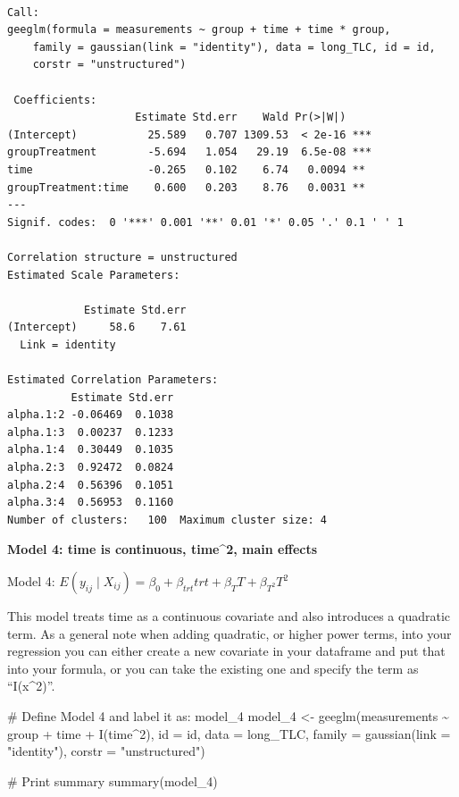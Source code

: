 \documentclass[
  letterpaper,
  DIV=11,
  numbers=noendperiod]{scrreprt}
\newenvironment{Shaded}{\begin{snugshade}}{\end{snugshade}}
\newcommand{\AttributeTok}[1]{\textcolor[rgb]{0.40,0.45,0.13}{#1}}
\newcommand{\CommentTok}[1]{\textcolor[rgb]{0.37,0.37,0.37}{#1}}
\newcommand{\DecValTok}[1]{\textcolor[rgb]{0.68,0.00,0.00}{#1}}
\newcommand{\FunctionTok}[1]{\textcolor[rgb]{0.28,0.35,0.67}{#1}}
\newcommand{\NormalTok}[1]{\textcolor[rgb]{0.00,0.23,0.31}{#1}}
\newcommand{\OtherTok}[1]{\textcolor[rgb]{0.00,0.23,0.31}{#1}}
\newcommand{\SpecialCharTok}[1]{\textcolor[rgb]{0.37,0.37,0.37}{#1}}
\newcommand{\StringTok}[1]{\textcolor[rgb]{0.13,0.47,0.30}{#1}}
\begin{document}
\begin{verbatim}

Call:
geeglm(formula = measurements ~ group + time + time * group, 
    family = gaussian(link = "identity"), data = long_TLC, id = id, 
    corstr = "unstructured")

 Coefficients:
                    Estimate Std.err    Wald Pr(>|W|)    
(Intercept)           25.589   0.707 1309.53  < 2e-16 ***
groupTreatment        -5.694   1.054   29.19  6.5e-08 ***
time                  -0.265   0.102    6.74   0.0094 ** 
groupTreatment:time    0.600   0.203    8.76   0.0031 ** 
---
Signif. codes:  0 '***' 0.001 '**' 0.01 '*' 0.05 '.' 0.1 ' ' 1

Correlation structure = unstructured 
Estimated Scale Parameters:

            Estimate Std.err
(Intercept)     58.6    7.61
  Link = identity 

Estimated Correlation Parameters:
          Estimate Std.err
alpha.1:2 -0.06469  0.1038
alpha.1:3  0.00237  0.1233
alpha.1:4  0.30449  0.1035
alpha.2:3  0.92472  0.0824
alpha.2:4  0.56396  0.1051
alpha.3:4  0.56953  0.1160
Number of clusters:   100  Maximum cluster size: 4 
\end{verbatim}

\textbf{Model 4: time is continuous, time\^{}2, main effects}

Model 4:
\(E(y_{ij} \mid X_{ij}) = \beta_0 + \beta_{trt}trt + \beta_{T}T + \beta_{T^2}T^2\)

This model treats time as a continuous covariate and also introduces a
quadratic term. As a general note when adding quadratic, or higher power
terms, into your regression you can either create a new covariate in
your dataframe and put that into your formula, or you can take the
existing one and specify the term as ``I(x\^{}2)''.

\begin{Shaded}
\begin{Highlighting}[]
\CommentTok{\# Define Model 4 and label it as: model\_4}
\NormalTok{model\_4 }\OtherTok{\textless{}{-}} \FunctionTok{geeglm}\NormalTok{(measurements }\SpecialCharTok{\textasciitilde{}}\NormalTok{ group }\SpecialCharTok{+}\NormalTok{ time }\SpecialCharTok{+} \FunctionTok{I}\NormalTok{(time}\SpecialCharTok{\^{}}\DecValTok{2}\NormalTok{), }\AttributeTok{id =}\NormalTok{ id, }\AttributeTok{data =}\NormalTok{ long\_TLC,}
    \AttributeTok{family =} \FunctionTok{gaussian}\NormalTok{(}\AttributeTok{link =} \StringTok{"identity"}\NormalTok{), }\AttributeTok{corstr =} \StringTok{"unstructured"}\NormalTok{)}

\CommentTok{\# Print summary}
\FunctionTok{summary}\NormalTok{(model\_4)}
\end{Highlighting}
\end{Shaded}
\end{document}
